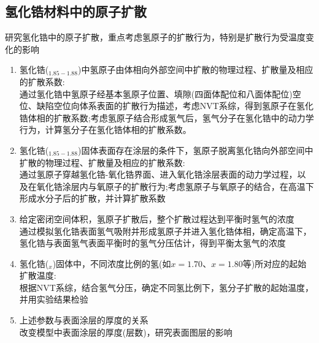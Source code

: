 \subsection{氢化锆材料中的原子扩散}
研究氢化锆中的原子扩散，重点考虑氢原子的扩散行为，特别是扩散行为受温度变化的影响
\begin{enumerate}
	\item 氢化锆($_{1.85-1.88}$)中氢原子由体相向外部空间中扩散的物理过程、扩散量及相应的扩散系数:\\
		通过氢化锆中氢原子经基本氢原子位置、填隙(四面体配位和八面体配位)空位、缺陷空位向体系表面的扩散行为描述，考虑\textrm{NVT}系综，得到氢原子在氢化锆体相的扩散系数;考虑氢原子结合形成氢气后，氢气分子在氢化锆中的动力学行为，计算氢分子在氢化锆体相的扩散系数。
	\item 氢化锆($_{1.85-1.88}$)固体表面存在涂层的条件下，氢原子脱离氢化锆向外部空间中扩散的物理过程、扩散量及相应的扩散系数:\\
		通过氢原子穿越氢化锆-氧化锆界面、进入氧化锆涂层表面的动力学过程，以及在氧化锆涂层内与氧原子的扩散行为;考虑氢原子与氧原子的结合，在高温下形成水分子后的扩散，并计算扩散系数
	\item 给定密闭空间体积，氢原子扩散后，整个扩散过程达到平衡时氢气的浓度\\
		通过模拟氢化锆表面氢气吸附并形成氢原子并进入氢化锆体相，确定高温下，氢化锆与表面氢气表面平衡时的氢气分压估计，得到平衡太氢气的浓度
	\item 氢化锆($_x$)固体中，不同浓度比例的氢(如$x=1.70$、$x=1.80$等)所对应的起始扩散温度:\\
		根据\textrm{NVT}系综，结合氢气分压，确定不同氢比例下，氢分子扩散的起始温度，并用实验结果检验
	\item 上述参数与表面涂层的厚度的关系\\
		改变模型中表面涂层的厚度(层数)，研究表面图层的影响
\end{enumerate}


